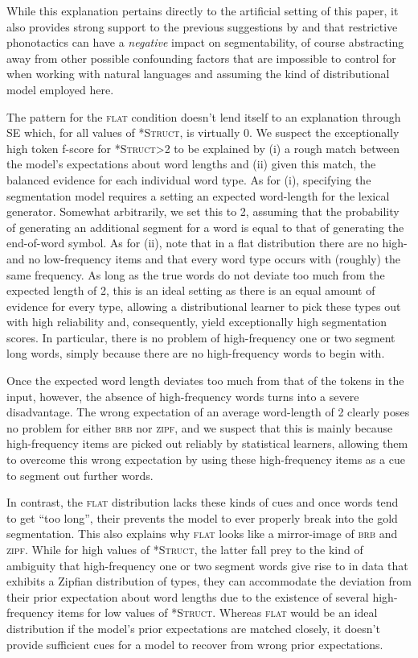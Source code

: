 \documentclass[11pt]{article}
\begin{document}
While this explanation pertains directly to the artificial setting of this paper, it also provides strong support to the previous suggestions by \cite{Daland13a} and \cite{Fourtassi13a} that restrictive phonotactics can have a \emph{negative} impact on segmentability, of course abstracting away from other possible confounding factors that are impossible to control for when working with natural languages and assuming the kind of distributional model employed here. 

The pattern for the \textsc{flat} condition doesn't lend itself to an explanation through SE which, for all values of \textsc{*Struct}, is virtually 0. We suspect the exceptionally high token f-score for \textsc{*Struct}>2 to be explained by (i) a rough match between the model's expectations about word lengths and (ii) given this match, the balanced evidence for each individual word type. As for (i), specifying the segmentation model requires a setting an expected word-length for the lexical generator. Somewhat arbitrarily, we set this to 2, assuming that the probability of generating an additional segment for a word is equal to that of generating the end-of-word symbol. As for (ii), note that in a flat distribution there are no high- and no low-frequency items and that every word type occurs with (roughly) the same frequency. As long as the true words do not deviate too much from the expected length of 2, this is an ideal setting as there is an equal amount of evidence for every type, allowing a distributional learner to pick these types out with high reliability and, consequently, yield exceptionally high segmentation scores. In particular, there is no problem of high-frequency one or two segment long words, simply because there are no high-frequency words to begin with.

Once the expected word length deviates too much from that of the tokens in the input, however, the absence of high-frequency words turns into a severe disadvantage. The wrong expectation of an average word-length of 2 clearly poses no problem for either \textsc{brb} nor \textsc{zipf}, and we suspect that this is mainly because high-frequency items are picked out reliably by statistical learners, allowing them to overcome this wrong expectation by using these high-frequency items as a cue to segment out further words. 

In contrast, the \textsc{flat} distribution lacks these kinds of cues and once words tend to get ``too long'', their prevents the model to ever properly break into the gold segmentation. This also explains why \textsc{flat} looks like a mirror-image of \textsc{brb} and \textsc{zipf}. While for high values of \textsc{*Struct}, the latter fall prey to the kind of ambiguity that high-frequency one or two segment words give rise to in data that exhibits a Zipfian distribution of types, they can accommodate the deviation from their prior expectation about word lengths due to the existence of several high-frequency items for low values of \textsc{*Struct}. Whereas \textsc{flat} would be an ideal distribution if the model's prior expectations are matched closely, it doesn't provide sufficient cues for a model to recover from wrong prior expectations.
 
\end{document}
